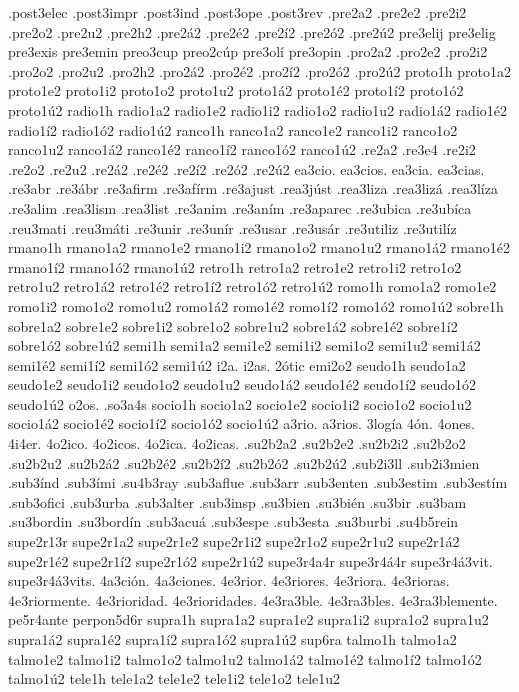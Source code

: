 {.post3elec
.post3impr
.post3ind
.post3ope
.post3rev
.pre2a2
.pre2e2
.pre2i2
.pre2o2
.pre2u2
.pre2h2
.pre2á2
.pre2é2
.pre2í2
.pre2ó2
.pre2ú2
pre3elij
pre3elig
pre3exis
pre3emin
preo3cup
preo2cúp
pre3olí
pre3opin
.pro2a2
.pro2e2
.pro2i2
.pro2o2
.pro2u2
.pro2h2
.pro2á2
.pro2é2
.pro2í2
.pro2ó2
.pro2ú2
proto1h
proto1a2 proto1e2 proto1i2 proto1o2 proto1u2
proto1á2 proto1é2 proto1í2 proto1ó2 proto1ú2
radio1h
radio1a2 radio1e2 radio1i2 radio1o2 radio1u2
radio1á2 radio1é2 radio1í2 radio1ó2 radio1ú2
ranco1h
ranco1a2 ranco1e2 ranco1i2 ranco1o2 ranco1u2
ranco1á2 ranco1é2 ranco1í2 ranco1ó2 ranco1ú2
.re2a2
.re3e4
.re2i2
.re2o2
.re2u2
.re2á2
.re2é2
.re2í2
.re2ó2
.re2ú2
ea3cio.
ea3cios.
ea3cia.
ea3cias.
.re3abr
.re3ábr
.re3afirm
.re3afírm
.re3ajust
.rea3júst
.rea3liza
.rea3lizá
.rea3líza
.re3alim
.rea3lism
.rea3list
.re3anim
.re3aním
.re3aparec
.re3ubica
.re3ubíca
.reu3mati
.reu3máti
.re3unir
.re3unír
.re3usar
.re3usár
.re3utiliz
.re3utilíz
rmano1h
rmano1a2 rmano1e2 rmano1i2 rmano1o2 rmano1u2
rmano1á2 rmano1é2 rmano1í2 rmano1ó2 rmano1ú2
retro1h
retro1a2 retro1e2 retro1i2 retro1o2 retro1u2
retro1á2 retro1é2 retro1í2 retro1ó2 retro1ú2
romo1h
romo1a2 romo1e2 romo1i2 romo1o2 romo1u2
romo1á2 romo1é2 romo1í2 romo1ó2 romo1ú2
sobre1h
sobre1a2 sobre1e2 sobre1i2 sobre1o2 sobre1u2
sobre1á2 sobre1é2 sobre1í2 sobre1ó2 sobre1ú2
semi1h
semi1a2 semi1e2 semi1i2 semi1o2 semi1u2
semi1á2 semi1é2 semi1í2 semi1ó2 semi1ú2
i2a.
i2as.
2ótic
emi2o2
seudo1h
seudo1a2 seudo1e2 seudo1i2 seudo1o2 seudo1u2
seudo1á2 seudo1é2 seudo1í2 seudo1ó2 seudo1ú2
o2os.
.so3a4s
socio1h
socio1a2 socio1e2 socio1i2 socio1o2 socio1u2
socio1á2 socio1é2 socio1í2 socio1ó2 socio1ú2
a3rio.
a3rios.
3logía
4ón.
4ones.
4i4er.
4o2ico.
4o2icos.
4o2ica.
4o2icas.
.su2b2a2
.su2b2e2
.su2b2i2
.su2b2o2
.su2b2u2
.su2b2á2
.su2b2é2
.su2b2í2
.su2b2ó2
.su2b2ú2
.sub2i3ll
.sub2i3mien
.sub3índ
.sub3ími
.su4b3ray
.sub3aflue
.sub3arr
.sub3enten
.sub3estim
.sub3estím
.sub3ofici
.sub3urba
.sub3alter
.sub3insp
.su3bien
.su3bién
.su3bir
.su3bam
.su3bordin
.su3bordín
.sub3acuá
.sub3espe
.sub3esta
.su3burbi
.su4b5rein
supe2r13r
supe2r1a2 supe2r1e2 supe2r1i2 supe2r1o2 supe2r1u2
supe2r1á2 supe2r1é2 supe2r1í2 supe2r1ó2 supe2r1ú2
supe3r4a4r
supe3r4á4r
supe3r4á3vit.
supe3r4á3vits.
4a3ción.
4a3ciones.
4e3rior.
4e3riores.
4e3riora.
4e3rioras.
4e3riormente.
4e3rioridad.
4e3rioridades.
4e3ra3ble.
4e3ra3bles.
4e3ra3blemente.
pe5r4ante
perpon5d6r
supra1h
supra1a2 supra1e2 supra1i2 supra1o2 supra1u2
supra1á2 supra1é2 supra1í2 supra1ó2 supra1ú2
sup6ra
talmo1h
talmo1a2 talmo1e2 talmo1i2 talmo1o2 talmo1u2
talmo1á2 talmo1é2 talmo1í2 talmo1ó2 talmo1ú2
tele1h
tele1a2 tele1e2 tele1i2 tele1o2 tele1u2
}

